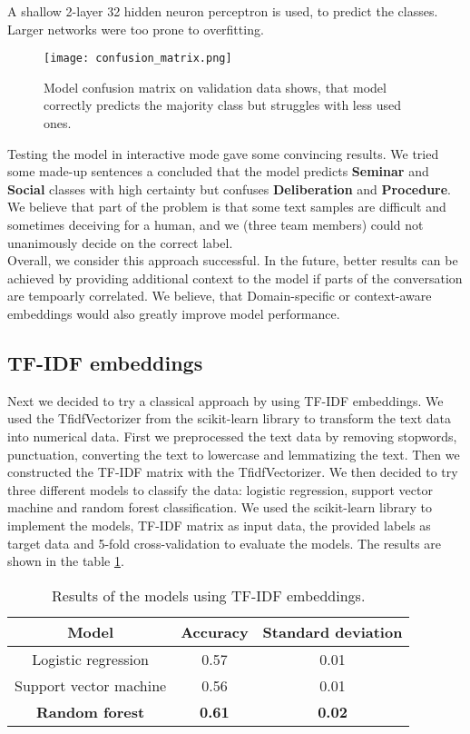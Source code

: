 \documentclass[fleqn,moreauthors,10pt]{ds_report}
\begin{document}
A shallow 2-layer 32 hidden neuron perceptron is used, to predict the classes. Larger networks were too prone to overfitting.

\begin{figure}[!htb]
    \centering
    \texttt{[image: confusion\_matrix.png]}
    \caption{Model confusion matrix on validation data shows, that model correctly predicts the majority class but struggles with less used ones.}
    \label{fig:conf_matrix_model}
\end{figure}

Testing the model in interactive mode gave some convincing results. We tried some made-up sentences a concluded that the model predicts \textbf{Seminar} and \textbf{Social} classes with high certainty but confuses \textbf{Deliberation} and \textbf{Procedure}. \\
We believe that part of the problem is that some text samples are difficult and sometimes deceiving for a human, and we (three team members) could not unanimously decide on the correct label. \\

Overall, we consider this approach successful. In the future, better results can be achieved by providing additional context to the model if parts of the conversation are tempoarly correlated. We believe, that Domain-specific or context-aware embeddings would also greatly improve model performance. 

\subsection{TF-IDF embeddings}
Next we decided to try a classical approach by using TF-IDF embeddings. We used the TfidfVectorizer from the scikit-learn library to transform the text data into numerical data. 
First we preprocessed the text data by removing stopwords, punctuation, converting the text to lowercase and lemmatizing the text. Then we constructed the TF-IDF matrix with the TfidfVectorizer.
We then decided to try three different models to classify the data: logistic regression, support vector machine and random forest classification. We used the scikit-learn library to implement the models, TF-IDF matrix as input data, the provided labels as target data and 5-fold cross-validation to evaluate the models.
The results are shown in the table \ref{tab:tfidf_results}.

\begin{table}[h]
    \centering
    \begin{tabular}{|c|c|c|}
    \hline
    \textbf{Model} & \textbf{Accuracy} & \textbf{Standard deviation} \\ \hline
    Logistic regression & 0.57 & 0.01 \\ \hline
    Support vector machine & 0.56 & 0.01 \\ \hline
    \textbf{Random forest} & \textbf{0.61} & \textbf{ 0.02} \\ \hline
    \end{tabular}

    \caption{Results of the models using TF-IDF embeddings.}
    \label{tab:tfidf_results}
\end{table}
\end{document}
